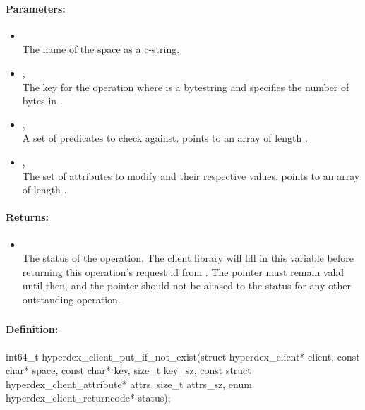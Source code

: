 \paragraph{Parameters:}
\begin{itemize}[noitemsep]
\item {}\\
The name of the space as a c-string.
\item {}, \\
The key for the operation where  is a bytestring and  specifies the number of bytes in .
\item {}, \\
A set of predicates to check against.   points to an array of length .
\item {}, \\
The set of attributes to modify and their respective values.   points to an array of length .
\end{itemize}

\paragraph{Returns:}
\begin{itemize}[noitemsep]
\item {}\\
The status of the operation.  The client library will fill in this variable before returning this operation's request id from .  The pointer must remain valid until then, and the pointer should not be aliased to the status for any other outstanding operation.
\end{itemize}

\pagebreak
\subsubsection{}
\label{api:c:put_if_not_exist}


\paragraph{Definition:}
\begin{ccode}
int64_t hyperdex_client_put_if_not_exist(struct hyperdex_client* client,
        const char* space,
        const char* key, size_t key_sz,
        const struct hyperdex_client_attribute* attrs, size_t attrs_sz,
        enum hyperdex_client_returncode* status);
\end{ccode}

